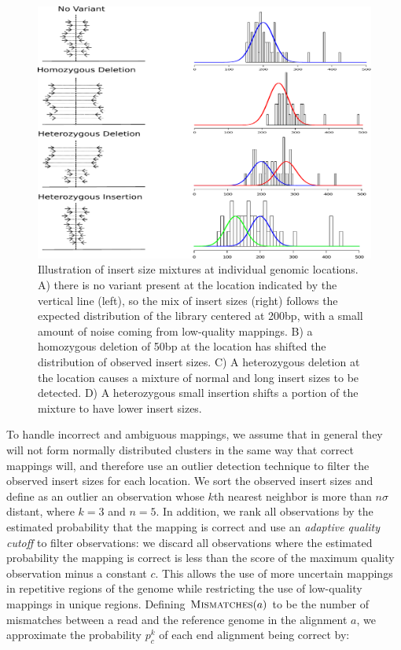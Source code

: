 \documentclass[11pt]{article}
\begin{document}
\begin{description}
\begin{figure}
\centering
\includegraphics[width=1\textwidth]{../figures/insert_size_mixtures.pdf}
\caption{Illustration of insert size mixtures at individual genomic locations. A) there is no variant present at the location indicated by the vertical line (left), so the mix of insert sizes (right) follows the expected distribution of the library centered at 200bp, with a small amount of noise coming from low-quality mappings. B) a homozygous deletion of 50bp at the location has shifted the distribution of observed insert sizes. C) A heterozygous deletion at the location causes a mixture of normal and long insert sizes to be detected. D) A heterozygous small insertion shifts a portion of the mixture to have lower insert sizes.}
\label{insert_size_mixes}
\end{figure}

To handle incorrect and ambiguous mappings, we assume that in general they will not form normally distributed clusters in the same way that correct mappings will, and therefore use an outlier detection technique to filter the observed insert sizes for each location. We sort the observed insert sizes and define as an outlier an observation whose $k$th nearest neighbor is more than $n\sigma$ distant, where $k = 3$ and $n = 5$. In addition, we rank all observations by the estimated probability that the mapping is correct and use an \emph{adaptive quality cutoff} to filter observations: we discard all observations where the estimated probability the mapping is correct is less than the score of the maximum quality observation minus a constant $c$. This allows the use of more uncertain mappings in repetitive regions of the genome while restricting the use of low-quality mappings in unique regions. Defining $\textsc{Mismatches}(a)$ to be the number of mismatches between a read and the reference genome in the alignment $a$, we approximate the probability $p^{k}_c$ of each end alignment being correct by:


\end{description}
\end{document}
